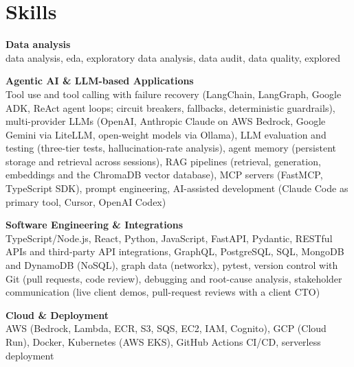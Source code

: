 \documentclass[a4paper,11pt]{article}
\newcommand{\skillgroup}[2]{{\color{headernavy}\textbf{#1}}\\ #2\par\vspace{3pt}}
\begin{document}
\section{Skills}
\skillgroup{Data analysis}{data analysis, eda, exploratory data analysis, data audit, data quality, explored}
\skillgroup{Agentic AI \& LLM-based Applications}{Tool use and tool calling with failure recovery (LangChain, LangGraph, Google ADK, ReAct agent loops; circuit breakers, fallbacks, deterministic guardrails), multi-provider LLMs (OpenAI, Anthropic Claude on AWS Bedrock, Google Gemini via LiteLLM, open-weight models via Ollama), LLM evaluation and testing (three-tier tests, hallucination-rate analysis), agent memory (persistent storage and retrieval across sessions), RAG pipelines (retrieval, generation, embeddings and the ChromaDB vector database), MCP servers (FastMCP, TypeScript SDK), prompt engineering, AI-assisted development (Claude Code as primary tool, Cursor, OpenAI Codex)}
\skillgroup{Software Engineering \& Integrations}{TypeScript/Node.js, React, Python, JavaScript, FastAPI, Pydantic, RESTful APIs and third-party API integrations, GraphQL, PostgreSQL, SQL, MongoDB and DynamoDB (NoSQL), graph data (networkx), pytest, version control with Git (pull requests, code review), debugging and root-cause analysis, stakeholder communication (live client demos, pull-request reviews with a client CTO)}
\skillgroup{Cloud \& Deployment}{AWS (Bedrock, Lambda, ECR, S3, SQS, EC2, IAM, Cognito), GCP (Cloud Run), Docker, Kubernetes (AWS EKS), GitHub Actions CI/CD, serverless deployment}
\end{document}
